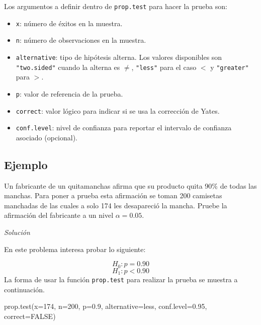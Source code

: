 \documentclass[
]{book}
\makeatletter
\newenvironment{Shaded}{\begin{snugshade}}{\end{snugshade}}
\newcommand{\AttributeTok}[1]{\textcolor[rgb]{0.77,0.63,0.00}{#1}}
\newcommand{\ConstantTok}[1]{\textcolor[rgb]{0.00,0.00,0.00}{#1}}
\newcommand{\DecValTok}[1]{\textcolor[rgb]{0.00,0.00,0.81}{#1}}
\newcommand{\FloatTok}[1]{\textcolor[rgb]{0.00,0.00,0.81}{#1}}
\newcommand{\FunctionTok}[1]{\textcolor[rgb]{0.00,0.00,0.00}{#1}}
\newcommand{\NormalTok}[1]{#1}
\newcommand{\StringTok}[1]{\textcolor[rgb]{0.31,0.60,0.02}{#1}}
\providecommand{\tightlist}{%
  \setlength{\itemsep}{0pt}\setlength{\parskip}{0pt}}
\newenvironment{kframe}{%
\medskip{}
\setlength{\fboxsep}{.8em}
 \def\at@end@of@kframe{}%
 \ifinner\ifhmode%
  \def\at@end@of@kframe{\end{minipage}}%
  \begin{minipage}{\columnwidth}%
 \fi\fi%
 \def\FrameCommand##1{\hskip\@totalleftmargin \hskip-\fboxsep
 \colorbox{shadecolor}{##1}\hskip-\fboxsep
     \hskip-\linewidth \hskip-\@totalleftmargin \hskip\columnwidth}%
 \MakeFramed {\advance\hsize-\width
   \@totalleftmargin\z@ \linewidth\hsize
   \@setminipage}}%
 {\par\unskip\endMakeFramed%
 \at@end@of@kframe}
\renewenvironment{Shaded}{\begin{kframe}}{\end{kframe}}
\makeatother
\begin{document}
Los argumentos a definir dentro de \texttt{prop.test} para hacer la prueba son:

\begin{itemize}
\tightlist
\item
  \texttt{x}: número de éxitos en la muestra.
\item
  \texttt{n}: número de observaciones en la muestra.
\item
  \texttt{alternative}: tipo de hipótesis alterna. Los valores disponibles son \texttt{"two.sided"} cuando la alterna es \(\neq\), \texttt{"less"} para el caso \(<\) y \texttt{"greater"} para \(>\).
\item
  \texttt{p}: valor de referencia de la prueba.
\item
  \texttt{correct}: valor lógico para indicar si se usa la corrección de Yates.
\item
  \texttt{conf.level}: nivel de confianza para reportar el intervalo de confianza asociado (opcional).
\end{itemize}

\hypertarget{ejemplo-66}{%
\subsection*{Ejemplo}\label{ejemplo-66}}

Un fabricante de un quitamanchas afirma que su producto quita 90\% de todas las manchas. Para poner a prueba esta afirmación se toman 200 camisetas manchadas de las cuales a solo 174 les desapareció la mancha. Pruebe la afirmación del fabricante a un nivel \(\alpha=0.05\).

\emph{Solución}

En este problema interesa probar lo siguiente:

\[H_0: p = 0.90\]
\[H_1: p < 0.90\]
La forma de usar la función \texttt{prop.test} para realizar la prueba se muestra a continuación.

\begin{Shaded}
\begin{Highlighting}[]
\FunctionTok{prop.test}\NormalTok{(}\AttributeTok{x=}\DecValTok{174}\NormalTok{, }\AttributeTok{n=}\DecValTok{200}\NormalTok{, }\AttributeTok{p=}\FloatTok{0.9}\NormalTok{, }\AttributeTok{alternative=}\StringTok{\textquotesingle{}less\textquotesingle{}}\NormalTok{,}
          \AttributeTok{conf.level=}\FloatTok{0.95}\NormalTok{, }\AttributeTok{correct=}\ConstantTok{FALSE}\NormalTok{)}
\end{Highlighting}
\end{Shaded}
\end{document}
